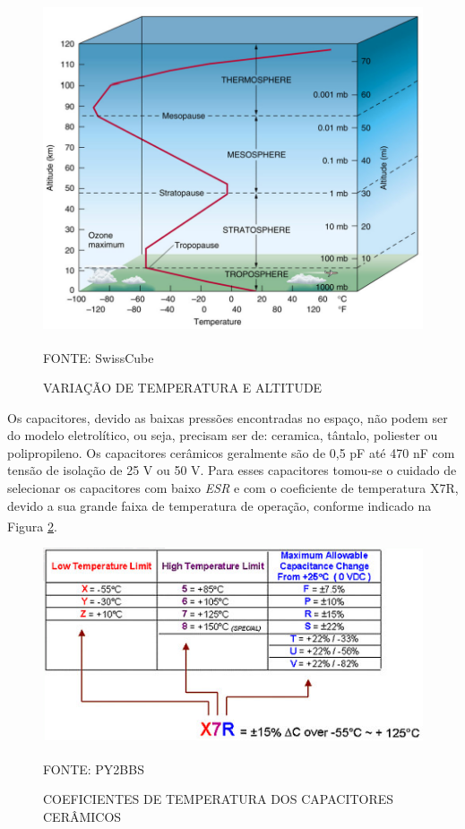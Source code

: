 \documentclass[
	12pt,				%
	openright,			%
	oneside,			%
	a4paper,			%
	english,			%
	french,				%
	spanish,			%
	brazil,				%
	oldfontcommands
	]{abntex2}
\begin{document}
	\begin{figure}[th]
		\caption{VARIAÇÃO DE TEMPERATURA E ALTITUDE}
		\label{Fig_Range_Temp}
		\centering
		\includegraphics[width=0.8\linewidth]{./figs/orbita_temp}
			
		\begin{small}
			FONTE: SwissCube\textsuperscript{\cite{SwissCube}}
		\end{small}		
	\end{figure}
	\pagebreak
	
	Os capacitores, devido as baixas pressões encontradas no espaço, não podem ser do modelo eletrolítico, ou seja, precisam ser de: ceramica, tântalo, poliester ou polipropileno. Os capacitores cerâmicos geralmente são de 0,5 pF até 470 nF com tensão de isolação de 25 V ou 50 V. Para esses capacitores tomou-se o cuidado de selecionar os capacitores com baixo \textit{ESR} e com o coeficiente de temperatura X7R, devido a sua grande faixa de temperatura de operação, conforme indicado na Figura \ref{Fig_Cap}.\textsuperscript{\cite{x7r}}
	
	\begin{figure}[th]
		\caption{COEFICIENTES DE TEMPERATURA DOS CAPACITORES CERÂMICOS}
		\label{Fig_Cap}
		\centering
		\includegraphics[width=0.8\linewidth]{./figs/x7r}
			
		\begin{small}
			FONTE: PY2BBS\textsuperscript{\cite{x7r}}
		\end{small}		
	\end{figure}	
	\pagebreak
	
\end{document}
